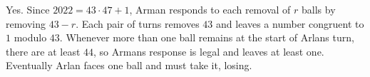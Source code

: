 Yes. Since $2022=43\cdot47+1$, Arman responds to each removal of $r$ balls by removing $43-r$. Each pair of turns removes $43$ and leaves a number congruent to $1$ modulo $43$. Whenever more than one ball remains at the start of Arlan\textquotesingle s turn, there are at least $44$, so Arman\textquotesingle s response is legal and leaves at least one. Eventually Arlan faces one ball and must take it, losing.
